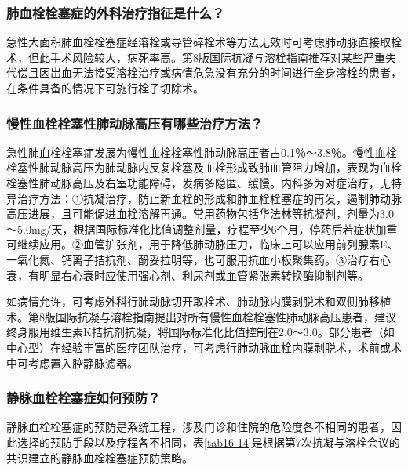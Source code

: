 \subsubsection{肺血栓栓塞症的外科治疗指征是什么？}

急性大面积肺血栓栓塞症经溶栓或导管碎栓术等方法无效时可考虑肺动脉直接取栓术，但此手术风险较大，病死率高。第8版国际抗凝与溶栓指南推荐对某些严重失代偿且因岀血无法接受溶栓治疗或病情危急没有充分的时间进行全身溶栓的患者，在条件具备的情况下可施行栓子切除术。

\subsubsection{慢性血栓栓塞性肺动脉高压有哪些治疗方法？}

急性肺血栓栓塞症发展为慢性血栓栓塞性肺动脉高压者占0.1％～3.8％。慢性血栓栓塞性肺动脉高压为肺动脉内反复栓塞及血栓形成致肺血管阻力增加，表现为血栓栓塞性肺动脉高压及右室功能障碍，发病多隐匿、缓慢。内科多为对症治疗，无特异治疗方法：①抗凝治疗，防止新血栓的形成和肺血栓栓塞症的再发，遏制肺动脉高压进展，且可能促进血栓溶解再通。常用药物包括华法林等抗凝剂，剂量为3.0～5.0mg/天，根据国际标准化比值调整剂量，疗程至少6个月，停药后若症状加重可继续应用。②血管扩张剂，用于降低肺动脉压力，临床上可以应用前列腺素E、一氧化氮、钙离子拮抗剂、酚妥拉明等，也可服用抗血小板聚集药。③治疗右心衰，有明显右心衰时应使用强心剂、利尿剂或血管紧张素转换酶抑制剂等。

如病情允许，可考虑外科行肺动脉切开取栓术、肺动脉内膜剥脱术和双侧肺移植术。第8版国际抗凝与溶栓指南提出对所有慢性血栓栓塞性肺动脉高压患者，建议终身服用维生素K拮抗剂抗凝，将国际标准化比值控制在2.0～3.0。部分患者（如中心型）在经验丰富的医疗团队治疗，可考虑行肺动脉血栓内膜剥脱术，术前或术中可考虑置入腔静脉滤器。

\subsubsection{静脉血栓栓塞症如何预防？}

静脉血栓栓塞症的预防是系统工程，涉及门诊和住院的危险度各不相同的患者，因此选择的预防手段以及疗程各不相同，表\ref{tab16-14}是根据第7次抗凝与溶栓会议的共识建立的静脉血栓栓塞症预防策略。

